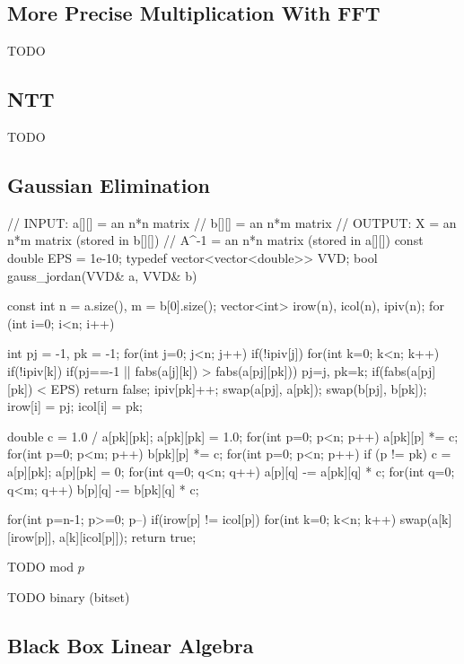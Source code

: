 \subsection{More Precise Multiplication With FFT}

TODO

\subsection{NTT}
TODO

\subsection{Gaussian Elimination}
\begin{cpp}
// INPUT:  a[][] = an n*n matrix
//         b[][] = an n*m matrix
// OUTPUT:   X  = an n*m matrix (stored in b[][])
//       A^{-1} = an n*n matrix (stored in a[][])
const double EPS = 1e-10;
typedef vector<vector<double>> VVD;
bool gauss_jordan(VVD& a, VVD& b) {
  const int n = a.size(), m = b[0].size();
  vector<int> irow(n), icol(n), ipiv(n);
  for (int i=0; i<n; i++){
    int pj = -1, pk = -1;
    for(int j=0; j<n; j++) if(!ipiv[j])
      for(int k=0; k<n; k++) if(!ipiv[k])
        if(pj==-1 || fabs(a[j][k]) > fabs(a[pj][pk]))
          pj=j, pk=k;
    if(fabs(a[pj][pk]) < EPS) return false;
    ipiv[pk]++;
    swap(a[pj], a[pk]); swap(b[pj], b[pk]);
    irow[i] = pj; icol[i] = pk;

    double c = 1.0 / a[pk][pk];
    a[pk][pk] = 1.0;
    for(int p=0; p<n; p++) a[pk][p] *= c;
    for(int p=0; p<m; p++) b[pk][p] *= c;
    for(int p=0; p<n; p++) if (p != pk) {
      c = a[p][pk]; a[p][pk] = 0;
      for(int q=0; q<n; q++) a[p][q] -= a[pk][q] * c;
      for(int q=0; q<m; q++) b[p][q] -= b[pk][q] * c;
    }
  }
  for(int p=n-1; p>=0; p--) if(irow[p] != icol[p]){
    for(int k=0; k<n; k++)
      swap(a[k][irow[p]], a[k][icol[p]]);
  }
  return true;
}
\end{cpp}

TODO mod $p$

TODO binary (bitset)

\subsection{Black Box Linear Algebra}

